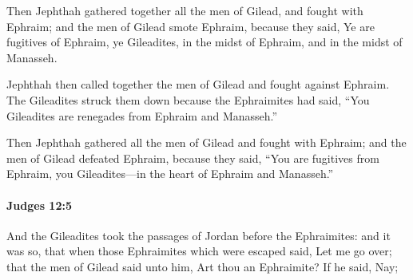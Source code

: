 			\begin{versebox}
					\item[BHS] 
					\item[ASV] Then Jephthah gathered together all the men of Gilead, and fought with Ephraim; and the men of Gilead smote Ephraim, because they said, Ye are fugitives of Ephraim, ye Gileadites, in the midst of Ephraim, and in the midst of Manasseh.
					\item[NIV] Jephthah then called together the men of Gilead and fought against Ephraim. The Gileadites struck them down because the Ephraimites had said, “You Gileadites are renegades from Ephraim and Manasseh.”
					\item[NRSV] Then Jephthah gathered all the men of Gilead and fought with Ephraim; and the men of Gilead defeated Ephraim, because they said, “You are fugitives from Ephraim, you Gileadites—in the heart of Ephraim and Manasseh.”
			\end{versebox}

		\paragraph{Judges 12:5} %
			\label{JUDGES-12-5}

			And the Gileadites took the passages of Jordan before the Ephraimites: and it was so, that when those Ephraimites which were escaped said, Let me go over; that the men of Gilead said unto him, Art thou an Ephraimite? If he said, Nay;

